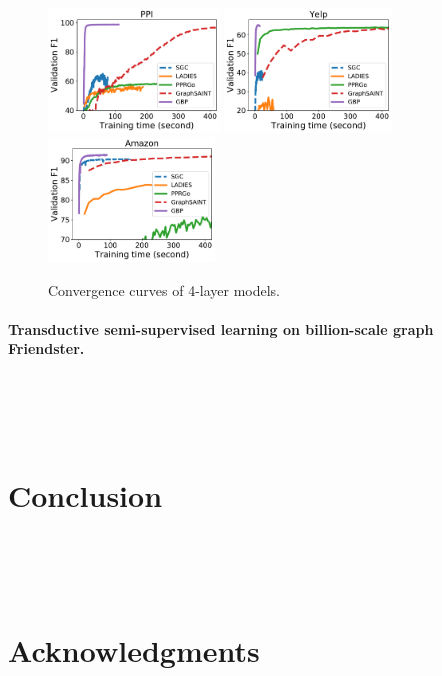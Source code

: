 \documentclass[UTF8]{article} %
\begin{document}
\begin{figure}[ht]
\begin{center}
\includegraphics[height=33mm]{ppi.pdf}
\includegraphics[height=33mm]{yelp.pdf}
\includegraphics[height=33mm]{amazon.pdf}
\vspace{-2mm}
\caption{Convergence curves of 4-layer models.} 
\vspace{-2mm}
\label{fig:convergence}
\end{center}
\vspace{-0.35cm}
\end{figure}

\paragraph{Transductive semi-supervised learning on billion-scale graph Friendster.}
~\\
~\\
~\\

\section{Conclusion}
~\\
~\\
~\\

\section*{Acknowledgments}
~\\
~\\
~\\



\end{document}
